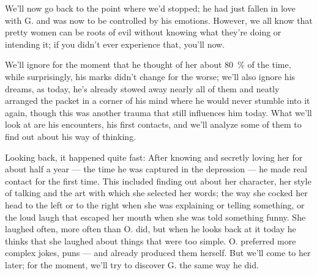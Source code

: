 We'll now go back to the point where we'd stopped; he had just fallen in love with G. and was now to be controlled by his emotions. However, we all know that pretty women can be roots of evil without knowing what they're doing or intending it; if you didn't ever experience that, you'll now.

We'll ignore for the moment that he thought of her about \SI{80}{\percent} of the time, while surprisingly, his marks didn't change for the worse; we'll also ignore his dreams, as today, he's already stowed away nearly all of them and neatly arranged the packet in a corner of his mind where he would never stumble into it again, though this was another trauma that still influences him today. What we'll look at are his encounters, his first contacts, and we'll analyze some of them to find out about his way of thinking.

Looking back, it happened quite fast: After knowing and secretly loving her for about half a year --- the time he was captured in the depression --- he made real contact for the first time. This included finding out about her character, her style of talking and the art with which she selected her words; the way she cocked her head to the left or to the right when she was explaining or telling something, or the loud laugh that escaped her mouth when she was told something funny. She laughed often, more often than O. did, but when he looks back at it today he thinks that she laughed about things that were too simple. O. preferred more complex jokes, puns --- and already produced them herself. But we'll come to her later; for the moment, we'll try to discover G. the same way he did.

